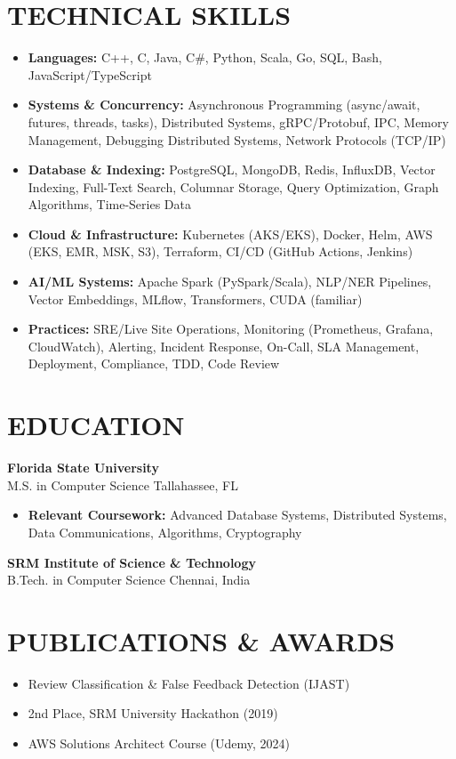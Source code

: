 \documentclass[letterpaper,10pt]{article}
\newcommand{\resumeItem}[1]{\item\small #1}
\newcommand{\resumeSubheading}[4]{
  \vspace{6pt}
  \noindent
  \textbf{#1} \hfill {\footnotesize #2} \\
  [-1pt]
  \noindent
  \small #3 \hfill {\small #4}
  \vspace{3pt}
}
\newcommand{\resumeItemsStart}{\vspace{-2pt}\begin{itemize}}
\newcommand{\resumeItemsEnd}{\end{itemize}\vspace{6pt}}
\begin{document}
\section{\textcolor{metablue}{TECHNICAL SKILLS}}
\vspace{-5pt}
\small
\begin{itemize}
\resumeItem{\textbf{Languages:} C++, C, Java, C\#, Python, Scala, Go, SQL, Bash, JavaScript/TypeScript}
\resumeItem{\textbf{Systems \& Concurrency:} Asynchronous Programming (async/await, futures, threads, tasks), Distributed Systems, gRPC/Protobuf, IPC, Memory Management, Debugging Distributed Systems, Network Protocols (TCP/IP)}
\resumeItem{\textbf{Database \& Indexing:} PostgreSQL, MongoDB, Redis, InfluxDB, Vector Indexing, Full-Text Search, Columnar Storage, Query Optimization, Graph Algorithms, Time-Series Data}
\resumeItem{\textbf{Cloud \& Infrastructure:} Kubernetes (AKS/EKS), Docker, Helm, AWS (EKS, EMR, MSK, S3), Terraform, CI/CD (GitHub Actions, Jenkins)}
\resumeItem{\textbf{AI/ML Systems:} Apache Spark (PySpark/Scala), NLP/NER Pipelines, Vector Embeddings, MLflow, Transformers, CUDA (familiar)}
\resumeItem{\textbf{Practices:} SRE/Live Site Operations, Monitoring (Prometheus, Grafana, CloudWatch), Alerting, Incident Response, On-Call, SLA Management, Deployment, Compliance, TDD, Code Review}
\end{itemize}
\vspace{-10pt}


\section{\textcolor{metablue}{EDUCATION}}
\vspace{-10pt}
\resumeSubheading
{Florida State University}{}
{M.S. in Computer Science}{Tallahassee, FL}
\resumeItemsStart
\resumeItem{\textbf{Relevant Coursework:} Advanced Database Systems, Distributed Systems, Data Communications, Algorithms, Cryptography}
\resumeItemsEnd
\vspace{-5pt}
\resumeSubheading
{SRM Institute of Science \& Technology}{}
{B.Tech. in Computer Science}{Chennai, India}
\vspace{-10pt}

\section{\textcolor{metablue}{PUBLICATIONS \& AWARDS}}
\vspace{-5pt}
\begin{itemize}
\resumeItem{Review Classification \& False Feedback Detection (IJAST)}
\resumeItem{2nd Place, SRM University Hackathon (2019)}
\resumeItem{AWS Solutions Architect Course (Udemy, 2024)}
\end{itemize}
\end{document}

